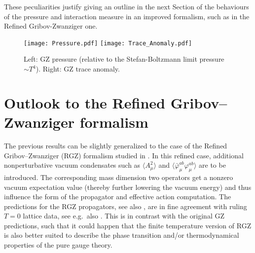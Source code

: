 These peculiarities justify giving an outline in the next Section of the behaviours of the pressure and interaction measure in an improved formalism, such as in the Refined Gribov-Zwanziger one.

\begin{figure}[h]
\begin{center}
\texttt{[image: Pressure.pdf]} \hspace{10mm} %
\texttt{[image: Trace\_Anomaly.pdf]}
\end{center}
\caption{Left: GZ pressure (relative to the Stefan-Boltzmann limit pressure $%
\sim T^{4}$). Right: GZ trace anomaly.}
\label{PTraceAnom}
\end{figure}




\section{Outlook to the Refined Gribov--Zwanziger formalism\label{RGZ-Ploop}}

The previous results can be slightly generalized to the case of the Refined
Gribov--Zwanziger (RGZ) formalism studied in \cite%
{Dudal:2007cw,Dudal:2008sp,Dudal:2011gd,Gracey:2010cg,Thelan:2014mza}. In
this refined case, additional nonperturbative vacuum condensates such as $%
\langle A_\mu^2\rangle$ and $\langle\bar\varphi_\mu^{ab}\varphi_\mu^{ab}%
\rangle$ are to be introduced. The corresponding mass dimension two
operators get a nonzero vacuum expectation value (thereby further lowering
the vacuum energy) and thus influence the form of the propagator and
effective action computation. The predictions for the RGZ propagators, see
also \cite{Dudal:2010tf,Dudal:2012zx,Oliveira:2012eh}, are in fine agreement
with ruling $T=0$ lattice data, see e.g.~also
\cite{Bogolubsky:2007ud,Cucchieri:2007md,Sternbeck:2007ug,Maas:2008ri,Oliveira:2008uf,Cucchieri:2008fc,Cucchieri:2007rg,Cucchieri:2008qm,Bogolubsky:2009dc}.
This is in contrast with the original GZ predictions, such that it could happen that the finite
temperature version of RGZ is also better suited to describe the phase transition and/or
thermodynamical properties of
the pure gauge theory.

